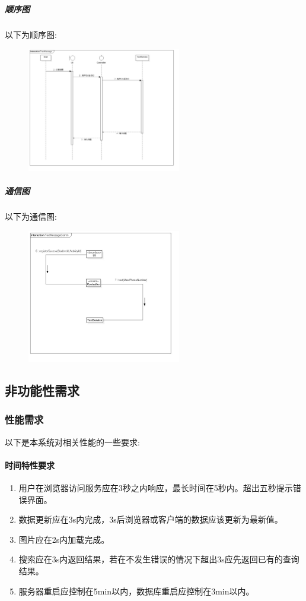 \documentclass[UTF8]{ctexart}
\begin{document}
\subparagraph*{顺序图}
以下为顺序图:\\
\begin{figure}[H]
\centering
\includegraphics[width = 0.6\textwidth]{TextMessageSeq.jpg}
\end{figure}

\subparagraph*{通信图}
以下为通信图:\\
\begin{figure}[H]
\centering
\includegraphics[width = 0.6\textwidth]{TextMessageComm.jpg}
\end{figure}



\subsection{非功能性需求}
\subsubsection{性能需求}
以下是本系统对相关性能的一些要求:

\paragraph{时间特性要求}
\begin{enumerate}[1)]
\item 用户在浏览器访问服务应在3秒之内响应，最长时间在5秒内。超出五秒提示错误界面。
\item 数据更新应在3s内完成，3s后浏览器或客户端的数据应该更新为最新值。
\item 图片应在2s内加载完成。
\item 搜索应在3s内返回结果，若在不发生错误的情况下超出3s应先返回已有的查询结果。
\item 服务器重启应控制在5min以内，数据库重启应控制在3min以内。
\end{enumerate}
\end{document}
